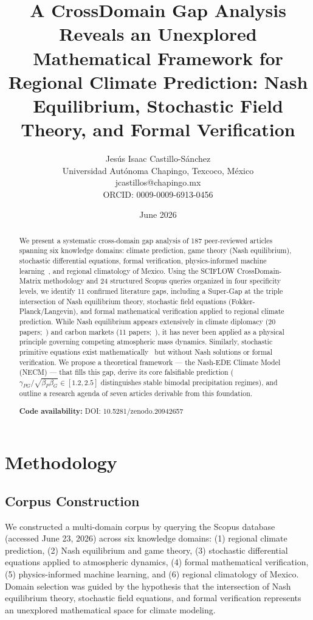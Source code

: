 \documentclass[12pt,a4paper]{article}
\title{A CrossDomain Gap Analysis Reveals an Unexplored Mathematical
Framework for Regional Climate Prediction: Nash Equilibrium,
Stochastic Field Theory, and Formal Verification}
\author{Jes\'{u}s Isaac Castillo-S\'{a}nchez\\
\small Universidad Aut\'{o}noma Chapingo, Texcoco, M\'{e}xico\\
\small jcastillos@chapingo.mx\\
\small ORCID: 0009-0009-6913-0456}
\date{June 2026}
\begin{document}
\sloppy
\maketitle

\begin{abstract}
We present a systematic cross-domain gap analysis of 187 peer-reviewed
articles spanning six knowledge domains: climate prediction, game theory
(Nash equilibrium), stochastic differential equations, formal verification,
physics-informed machine learning~\citep{Raissi2019, LeCun2015}, and regional climatology of Mexico.
Using the SCIFLOW CrossDomain-Matrix methodology and 24 structured Scopus
queries organized in four specificity levels, we identify 11 confirmed
literature gaps, including a Super-Gap at the triple intersection of
Nash equilibrium theory, stochastic field equations (Fokker-Planck/Langevin),
and formal mathematical verification applied to regional climate prediction.
While Nash equilibrium appears extensively in climate diplomacy (20 papers;~\citealt{Forgo2005})
and carbon markets (11 papers;~\citealt{Haurie2004}), it has never been applied as a physical
principle governing competing atmospheric mass dynamics. Similarly,
stochastic primitive equations exist mathematically~\citep{Debussche2012, Guo2021} \citep{Debussche2012,
Majda2006} but without Nash solutions or formal verification.
We propose a theoretical framework --- the Nash-EDE Climate Model (NECM) ---
that fills this gap, derive its core falsifiable prediction
($\gamma_{PG}/\sqrt{\beta_P\beta_G} \in [1.2, 2.5]$ distinguishes
stable bimodal precipitation regimes), and outline a research agenda
of seven articles derivable from this foundation.

\noindent\textbf{Code availability:} DOI: 10.5281/zenodo.20942657
\end{abstract}


\section{Methodology}

\subsection{Corpus Construction}

We constructed a multi-domain corpus by querying the Scopus database
(accessed June 23, 2026) across six knowledge domains: (1) regional
climate prediction, (2) Nash equilibrium and game theory, (3) stochastic
differential equations applied to atmospheric dynamics, (4) formal
mathematical verification, (5) physics-informed machine learning, and
(6) regional climatology of Mexico. Domain selection was guided by the
hypothesis that the intersection of Nash equilibrium theory, stochastic
field equations, and formal verification represents an unexplored
mathematical space for climate modeling.
\end{document}

